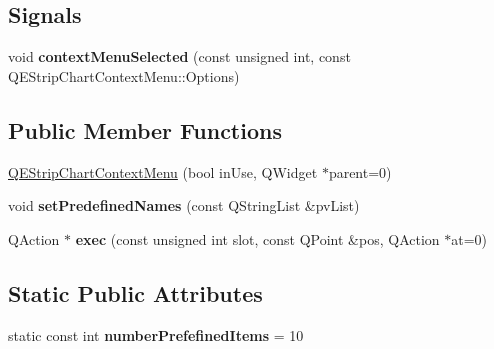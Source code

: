 \subsection*{Signals}
\begin{DoxyCompactItemize}
\item 
\hypertarget{classQEStripChartContextMenu_a87949fba820094208ca53c4523265884}{
void {\bfseries contextMenuSelected} (const unsigned int, const QEStripChartContextMenu::Options)}
\label{classQEStripChartContextMenu_a87949fba820094208ca53c4523265884}

\end{DoxyCompactItemize}
\subsection*{Public Member Functions}
\begin{DoxyCompactItemize}
\item 
\hyperlink{classQEStripChartContextMenu_a58e41b39d1432c22cb0603e43eb84b66}{QEStripChartContextMenu} (bool inUse, QWidget $\ast$parent=0)
\item 
\hypertarget{classQEStripChartContextMenu_ad729e5b6b760e7688fde1ccc59cb9e4c}{
void {\bfseries setPredefinedNames} (const QStringList \&pvList)}
\label{classQEStripChartContextMenu_ad729e5b6b760e7688fde1ccc59cb9e4c}

\item 
\hypertarget{classQEStripChartContextMenu_a9a959ae566b571660c602d0c80f94192}{
QAction $\ast$ {\bfseries exec} (const unsigned int slot, const QPoint \&pos, QAction $\ast$at=0)}
\label{classQEStripChartContextMenu_a9a959ae566b571660c602d0c80f94192}

\end{DoxyCompactItemize}
\subsection*{Static Public Attributes}
\begin{DoxyCompactItemize}
\item 
\hypertarget{classQEStripChartContextMenu_a716ee3675fd7ba2e31091fd18ad8d082}{
static const int {\bfseries numberPrefefinedItems} = 10}
\label{classQEStripChartContextMenu_a716ee3675fd7ba2e31091fd18ad8d082}

\end{DoxyCompactItemize}


